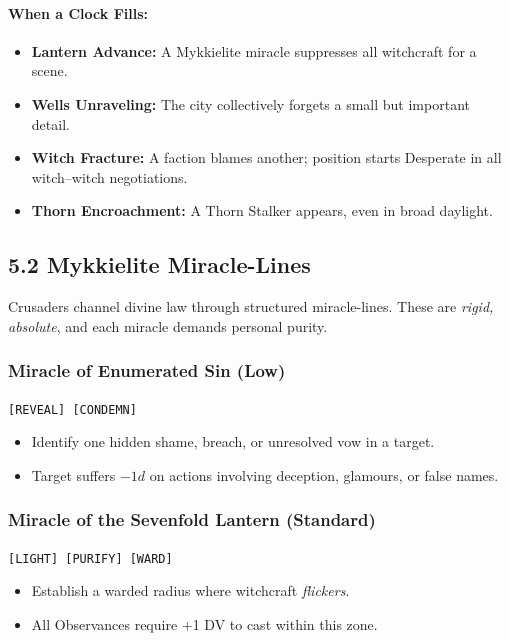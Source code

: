 \documentclass[11pt]{book}
\begin{document}
\paragraph{When a Clock Fills:}
\begin{itemize}[leftmargin=*]
    \item \textbf{Lantern Advance:} A Mykkielite miracle suppresses all witchcraft for a scene.
    \item \textbf{Wells Unraveling:} The city collectively forgets a small but important detail.
    \item \textbf{Witch Fracture:} A faction blames another; position starts Desperate in all witch--witch negotiations.
    \item \textbf{Thorn Encroachment:} A Thorn Stalker appears, even in broad daylight.
\end{itemize}

\subsection{5.2 Mykkielite Miracle-Lines}

Crusaders channel divine law through structured miracle-lines.  
These are \emph{rigid, absolute}, and each miracle demands personal purity.

\subsubsection*{Miracle of Enumerated Sin (Low)}
\texttt{[REVEAL] [CONDEMN]}
\begin{itemize}
    \item Identify one hidden shame, breach, or unresolved vow in a target.
    \item Target suffers $-1d$ on actions involving deception, glamours, or false names.
\end{itemize}

\subsubsection*{Miracle of the Sevenfold Lantern (Standard)}
\texttt{[LIGHT] [PURIFY] [WARD]}
\begin{itemize}
    \item Establish a warded radius where witchcraft \emph{flickers}.
    \item All Observances require +1 DV to cast within this zone.
\end{itemize}
\end{document}
